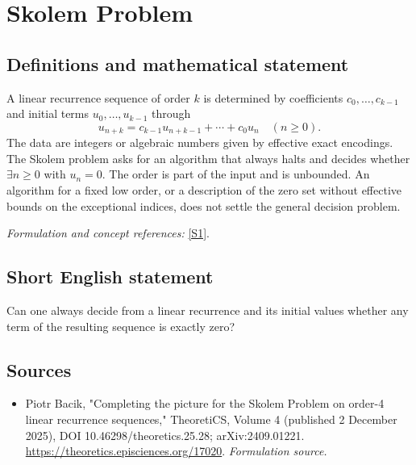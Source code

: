 \documentclass[11pt]{article}
\begin{document}
\section*{\texorpdfstring{Skolem Problem}{Skolem Problem}}\label{statement}
\subsection{Definitions and mathematical statement}
A linear recurrence sequence of order $k$ is determined by coefficients $c_0,\ldots,c_{k-1}$ and initial terms $u_0,\ldots,u_{k-1}$ through
\[
 u_{n+k}=c_{k-1}u_{n+k-1}+\cdots+c_0u_n\quad(n\ge0).
\]
The data are integers or algebraic numbers given by effective exact encodings. The Skolem problem asks for an algorithm that always halts and decides whether $\exists n\ge0$ with $u_n=0$. The order is part of the input and is unbounded. An algorithm for a fixed low order, or a description of the zero set without effective bounds on the exceptional indices, does not settle the general decision problem.
\par\smallskip\textit{Formulation and concept references:} \href{https://theoretics.episciences.org/17020}{[S1]}.

\subsection{Short English statement}
Can one always decide from a linear recurrence and its initial values whether any term of the resulting sequence is exactly zero?
\subsection{Sources}
\begin{itemize}
\item[S1]Piotr Bacik, "Completing the picture for the Skolem Problem on order-4 linear recurrence sequences," TheoretiCS, Volume 4 (published 2 December 2025), DOI 10.46298/theoretics.25.28; arXiv:2409.01221.
\url{https://theoretics.episciences.org/17020}.
\textit{Formulation source.}
\end{itemize}
\end{document}
